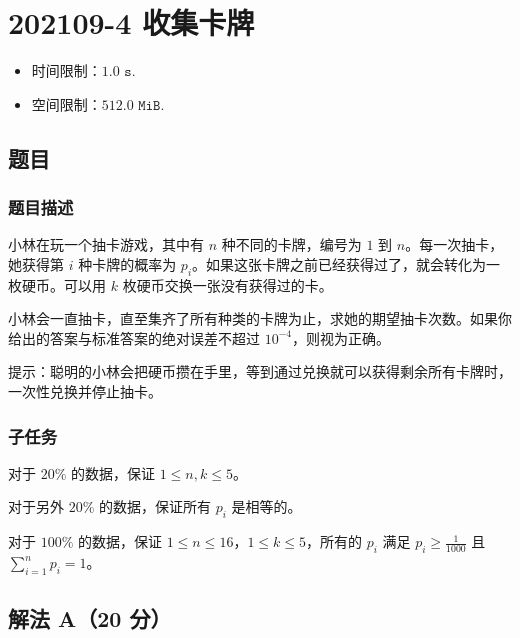 \section{202109-4 收集卡牌}
	\begin{itemize}
		\item 时间限制：$1.0\texttt{ s}$.
		\item 空间限制：$512.0\texttt{ MiB}$.
	\end{itemize}
	\subsection{题目}
		\subsubsection{题目描述}
			\par 小林在玩一个抽卡游戏，其中有 $n$ 种不同的卡牌，编号为 $1$ 到 $n$。每一次抽卡，她获得第 $i$ 种卡牌的概率为 $p_i$。如果这张卡牌之前已经获得过了，就会转化为一枚硬币。可以用 $k$ 枚硬币交换一张没有获得过的卡。
			\par 小林会一直抽卡，直至集齐了所有种类的卡牌为止，求她的期望抽卡次数。如果你给出的答案与标准答案的绝对误差不超过 $10^{-4}$，则视为正确。
			\par 提示：聪明的小林会把硬币攒在手里，等到通过兑换就可以获得剩余所有卡牌时，一次性兑换并停止抽卡。
		\subsubsection{子任务}
			\par 对于 $20\%$ 的数据，保证 $1\leq n,k\leq 5$。
			\par 对于另外 $20\%$ 的数据，保证所有 $p_i$ 是相等的。
			\par 对于 $100\%$ 的数据，保证 $1\leq n\leq 16$，$1\leq k\leq 5$，所有的 $p_i$ 满足 $p_i\geq\frac{1}{1000}$ 且 $\sum\limits_{i=1}^np_i=1$。
	\subsection{解法 A（20 分）}
